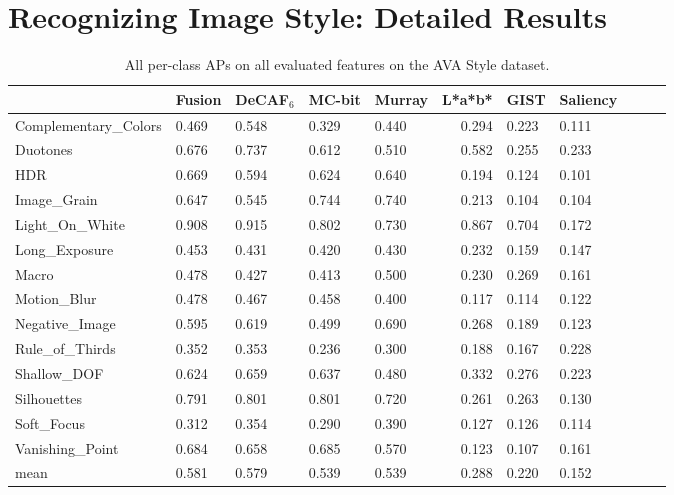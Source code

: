 \chapter{Recognizing Image Style: Detailed Results}\label{sec:style_appendix}

\begin{table}[ht!]
\caption{
    All per-class APs on all evaluated features on the AVA Style dataset.
}\label{tab:ava_style_ap_table}
\vspace{1em}
\centering
\small{
\begin{tabular}{lllllrlllll}
\toprule
{}                    & Fusion & DeCAF$_6$ & MC-bit & Murray & L*a*b* & GIST  & Saliency \\
\midrule
Complementary\_Colors & 0.469  & 0.548     & 0.329  & 0.440  & 0.294  & 0.223 & 0.111 \\
Duotones              & 0.676  & 0.737     & 0.612  & 0.510  & 0.582  & 0.255 & 0.233 \\
HDR                   & 0.669  & 0.594     & 0.624  & 0.640  & 0.194  & 0.124 & 0.101 \\
Image\_Grain          & 0.647  & 0.545     & 0.744  & 0.740  & 0.213  & 0.104 & 0.104 \\
Light\_On\_White      & 0.908  & 0.915     & 0.802  & 0.730  & 0.867  & 0.704 & 0.172 \\
Long\_Exposure        & 0.453  & 0.431     & 0.420  & 0.430  & 0.232  & 0.159 & 0.147 \\
Macro                 & 0.478  & 0.427     & 0.413  & 0.500  & 0.230  & 0.269 & 0.161 \\
Motion\_Blur          & 0.478  & 0.467     & 0.458  & 0.400  & 0.117  & 0.114 & 0.122 \\
Negative\_Image       & 0.595  & 0.619     & 0.499  & 0.690  & 0.268  & 0.189 & 0.123 \\
Rule\_of\_Thirds      & 0.352  & 0.353     & 0.236  & 0.300  & 0.188  & 0.167 & 0.228 \\
Shallow\_DOF          & 0.624  & 0.659     & 0.637  & 0.480  & 0.332  & 0.276 & 0.223 \\
Silhouettes           & 0.791  & 0.801     & 0.801  & 0.720  & 0.261  & 0.263 & 0.130 \\
Soft\_Focus           & 0.312  & 0.354     & 0.290  & 0.390  & 0.127  & 0.126 & 0.114 \\
Vanishing\_Point      & 0.684  & 0.658     & 0.685  & 0.570  & 0.123  & 0.107 & 0.161 \\
\midrule
mean                  & 0.581  & 0.579     & 0.539  & 0.539  & 0.288  & 0.220 & 0.152 \\
\bottomrule
\end{tabular}
}
\end{table}

